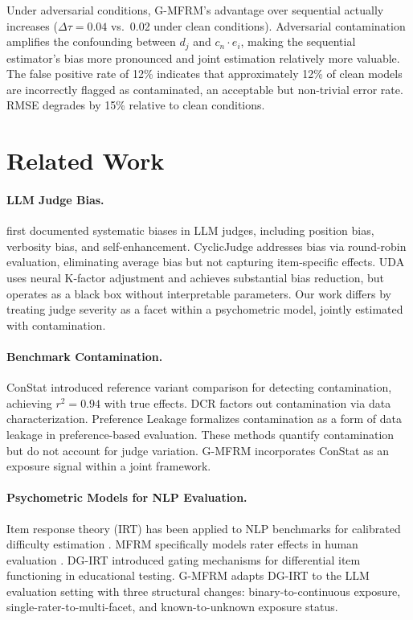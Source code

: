 \documentclass[11pt]{article}
\begin{document}
Under adversarial conditions, G-MFRM's advantage over sequential actually increases ($\Delta\tau = 0.04$ vs.\ 0.02 under clean conditions). Adversarial contamination amplifies the confounding between $d_j$ and $c_n \cdot e_i$, making the sequential estimator's bias more pronounced and joint estimation relatively more valuable. The false positive rate of 12\% indicates that approximately 12\% of clean models are incorrectly flagged as contaminated, an acceptable but non-trivial error rate. RMSE degrades by 15\% relative to clean conditions.

\section{Related Work}

\paragraph{LLM Judge Bias.}
\citet{zheng2023judging} first documented systematic biases in LLM judges, including position bias, verbosity bias, and self-enhancement. CyclicJudge \citep{cyclicjudge2025} addresses bias via round-robin evaluation, eliminating average bias but not capturing item-specific effects. UDA \citep{uda2025} uses neural K-factor adjustment and achieves substantial bias reduction, but operates as a black box without interpretable parameters. Our work differs by treating judge severity as a facet within a psychometric model, jointly estimated with contamination.

\paragraph{Benchmark Contamination.}
ConStat \citep{constat2024} introduced reference variant comparison for detecting contamination, achieving $r^2 = 0.94$ with true effects. DCR \citep{dcr2025} factors out contamination via data characterization. Preference Leakage \citep{prefleak2025} formalizes contamination as a form of data leakage in preference-based evaluation. These methods quantify contamination but do not account for judge variation. G-MFRM incorporates ConStat as an exposure signal within a joint framework.

\paragraph{Psychometric Models for NLP Evaluation.}
Item response theory (IRT) has been applied to NLP benchmarks for calibrated difficulty estimation \citep{irt_nlp2020}. MFRM specifically models rater effects in human evaluation \citep{linacre1989mfrm}. DG-IRT \citep{dgirt2024} introduced gating mechanisms for differential item functioning in educational testing. G-MFRM adapts DG-IRT to the LLM evaluation setting with three structural changes: binary-to-continuous exposure, single-rater-to-multi-facet, and known-to-unknown exposure status.
\end{document}
